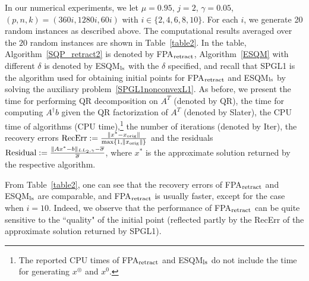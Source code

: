 \documentclass[10pt]{article}
\numberwithin{equation}{section}
\def\R{{\rm I\!R}}
\def\xorig{{x_{\rm orig}}}
\def\xfeasss{x^\circledcirc}
\begin{document}

In our numerical experiments, we let $\mu =0.95$, $j = 2$, $\gamma = 0.05$, $(p,n,k) = (360i,1280i,60i)$ with $i\in \{2, 4, 6, 8, 10\}$. For each $i$, we generate 20 random instances as described above. The computational results averaged over the $20$ random instances are shown in Table~\ref{table2}. In the table, Algorithm~\ref{SQP_retract2} is denoted by FPA$_{\rm retract}$, Algorithm~\ref{ESQM} with different $\delta$ is denoted by ESQM$_{\rm ls}$ with the $\delta$ specified, and recall that SPGL1 is the algorithm used for obtaining initial points for FPA$_{\rm retract}$ and ESQM$_{\rm ls}$ by solving the auxiliary problem~\eqref{SPGL1nonconvexL1}. As before, we present the time for performing QR decomposition on $A^T$ (denoted by QR), the time for computing $A^\dagger b$ given the QR factorization of $A^T$ (denoted by Slater), the CPU time of algorithms (CPU time),\footnote{The reported CPU times of FPA$_{\rm retract}$ and ESQM$_{\rm ls}$ do not include the time for generating $\xfeasss$ and $x^0$.} the number of iterations (denoted by Iter), the recovery errors $\text{RecErr} := \frac{\|x^* - \xorig\|}{\max\{1, \|\xorig\|\}}$ and the residuals ${\rm Residual} := \frac{\|Ax^* - b\|_{LL_2,\gamma} - \overline{\sigma} }{\overline{\sigma}}$, where $x^*$ is the approximate solution returned by the respective algorithm.

From Table~\ref{table2}, one can see that the recovery errors of FPA$_{\rm retract}$ and ESQM$_{\rm ls}$ are comparable, and FPA$_{\rm retract}$ is usually faster, except for the case when $i = 10$.
Indeed, we observe that the performance of FPA$_{\rm retract}$ can be quite sensitive to the ``quality" of the initial point (reflected partly by the RecErr of the approximate solution returned by SPGL1).

\end{document}
